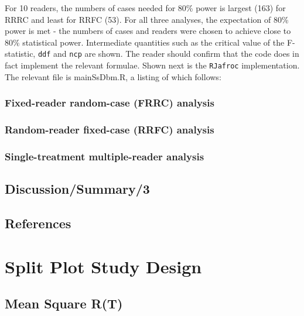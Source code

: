 \documentclass[
]{book}
\begin{document}
For 10 readers, the numbers of cases needed for 80\% power is largest (163) for RRRC and least for RRFC (53). For all three analyses, the expectation of 80\% power is met - the numbers of cases and readers were chosen to achieve close to 80\% statistical power. Intermediate quantities such as the critical value of the F-statistic, \texttt{ddf} and \texttt{ncp} are shown. The reader should confirm that the code does in fact implement the relevant formulae. Shown next is the \texttt{RJafroc} implementation. The relevant file is mainSsDbm.R, a listing of which follows:

\hypertarget{RocSampleSizeOR-FRRCAnalysis}{%
\subsection{Fixed-reader random-case (FRRC) analysis}\label{RocSampleSizeOR-FRRCAnalysis}}

\hypertarget{RocSampleSizeOR-RRFCAnalysis}{%
\subsection{Random-reader fixed-case (RRFC) analysis}\label{RocSampleSizeOR-RRFCAnalysis}}

\hypertarget{RocSampleSizeOR-STMRAnalysis}{%
\subsection{Single-treatment multiple-reader analysis}\label{RocSampleSizeOR-STMRAnalysis}}

\hypertarget{discussionsummary3}{%
\section{Discussion/Summary/3}\label{discussionsummary3}}

\hypertarget{RocSampleSizeOR-references}{%
\section{References}\label{RocSampleSizeOR-references}}

\hypertarget{SplitPlotChapter}{%
\chapter{Split Plot Study Design}\label{SplitPlotChapter}}

\hypertarget{mean-square-rt}{%
\section{Mean Square R(T)}\label{mean-square-rt}}
\end{document}
